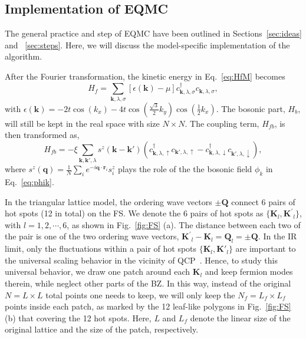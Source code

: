 \documentclass[aps,prx,twocolumn,superscriptaddress,showpacs,floatfix]{revtex4-1}
\begin{document}
\subsection{Implementation of EQMC}
\label{sec:implement}

The general practice and step of EQMC have been outlined in Sections~\ref{sec:ideas} and ~\ref{sec:steps}. Here, we will discuss the model-specific implementation of the algorithm.

After the Fourier transformation, the kinetic energy in Eq.~\eqref{eq:HfM} becomes
\begin{equation}
  \label{eq:HfMk}
H_{f}=\sum_{\mathbf{k},\lambda,\sigma}[\epsilon(\mathbf{k})-\mu]c^{\dagger}_{\mathbf{k},\lambda,\sigma}c_{\mathbf{k},\lambda,\sigma},
\end{equation}
with $\epsilon(\mathbf{k})=-2t\cos(k_x)-4t\cos(\frac{\sqrt{3}}{2}k_y)\cos(\frac{1}{2}k_x)$. The bosonic part, $H_{b}$, will still be kept in the real space with size $N\times N$. The coupling term, $H_{fb}$, is then transformed as,
\begin{equation}
\label{eq:HfbMk}
H_{fb}=
-\xi\sum_{\mathbf{k},\mathbf{k'},\lambda}s^{z}(\mathbf{k}-\mathbf{k'})(c^{\dagger}_{\mathbf{k},\lambda,\uparrow}c_{\mathbf{k'},\lambda,\uparrow}-c^{\dagger}_{\mathbf{k},\lambda,\downarrow}c_{\mathbf{k'},\lambda,\downarrow}),
\end{equation}
where $s^{z}(\mathbf{q})=\frac{1}{N}\sum_{i}e^{-i\mathbf{q}\cdot\mathbf{r}_i}s^{z}_{i}$ plays the role of the the bosonic field $\phi_{k}$ in Eq.~\eqref{eq:phik}.

In the triangular lattice model, the ordering wave vectors $\pm\mathbf{Q}$ connect 6 pairs of hot spots (12 in total) on the FS.
We denote the 6 pairs of hot spots as $\{\mathbf{K}_{l}, \mathbf{K^\prime}_{l}\}$, with $l=1,2,\cdots,6$, as shown in Fig.~\ref{fig:FS} (a).
The distance between each two of the pair is one of the two ordering wave vectors, $\mathbf{K^\prime}_{l} - \mathbf{K}_{l} = \mathbf{Q}_l = \pm\mathbf{Q}$.
In the IR limit, only the fluctuations within a pair of hot spots $\{\mathbf{K}_{l}, \mathbf{K'}_{l}\}$ are important to the universal scaling behavior in the vicinity of QCP~\cite{Metzner2003,Abanov2003,Abanov2004,Loehneysen2007,Metlitski2010,Metlitski2010a,Metlitski2010b}.
Hence, to study this universal behavior, we draw one patch around each $\mathbf{K}_{l}$ and keep fermion modes therein, while neglect other parts of the BZ.
In this way, instead of the original $N=L \times L$ total points one needs to keep, we will only keep the $N_f=L_f\times L_f$ points inside each patch, as marked by the 12 leaf-like polygons in Fig.~\ref{fig:FS} (b) that covering the 12 hot spots.
Here, $L$ and $L_f$ denote the linear size of the original lattice and the size of the patch, respectively.
\end{document}
